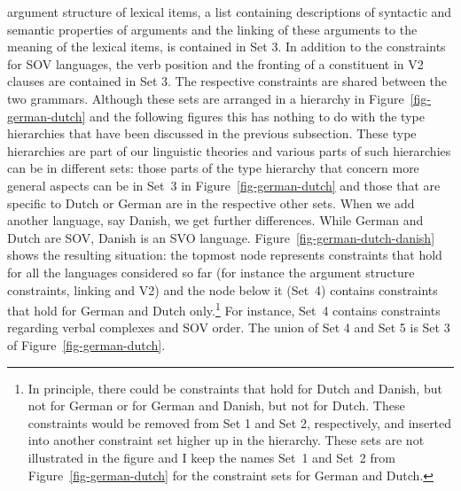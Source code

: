 argument structure of lexical items, a list containing descriptions of syntactic and semantic properties of
arguments and the linking of these arguments to the meaning of the lexical items, is contained in Set 3. In
addition to the constraints for SOV languages, the verb position and the fronting of a
constituent in V2 clauses are contained in Set 3. The respective constraints are shared between the
two grammars. Although these sets are arranged in a hierarchy in Figure~\ref{fig-german-dutch} and
the following figures this has nothing to do with the type hierarchies that have been discussed in the previous subsection. These type
hierarchies are part of our linguistic theories and various parts of such hierarchies can be in different
sets: those parts of the type hierarchy that concern more general aspects can be in Set~3 in
Figure~\ref{fig-german-dutch} and those that are specific to Dutch or German are in the respective
other sets. When we add another language, say Danish, we get further differences. While German and Dutch are SOV, Danish
is an SVO language. Figure~\vref{fig-german-dutch-danish} shows the resulting situation: the
topmost node represents constraints that hold for all the languages considered so far (for instance the argument
structure constraints, linking and V2) and the node below it (Set~4) contains
constraints that hold for German and Dutch only.\footnote{%
  In principle, there could be constraints that hold for Dutch and Danish, but not for German or for
  German and Danish, but not for Dutch. These constraints would be removed from Set 1 and Set 2,
  respectively, and inserted into another constraint set higher up in the hierarchy. These sets are not
  illustrated in the figure and I keep the names Set~1 and Set~2 from Figure~\ref{fig-german-dutch} for the constraint sets for German
  and Dutch.
} For instance, Set~4 contains constraints regarding verbal complexes and SOV order.
The union of Set 4 and Set 5 is Set 3 of Figure~\ref{fig-german-dutch}.
